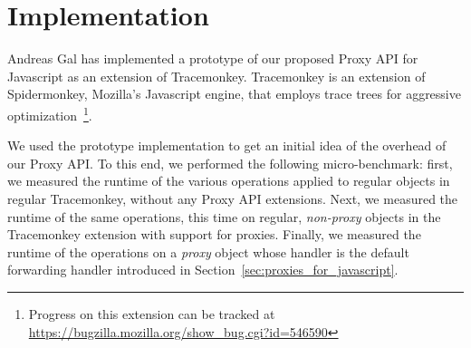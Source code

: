 \documentclass{sig-alternate}
\begin{document}




\section{Implementation}
\label{sub:benchmarks}

Andreas Gal has implemented a prototype of our proposed Proxy API for Javascript as an extension of Tracemonkey. Tracemonkey is an extension of Spidermonkey, Mozilla's Javascript engine, that employs trace trees for aggressive optimization~\cite{gal06efficient}\footnote{Progress on this extension can be tracked at \url{https://bugzilla.mozilla.org/show_bug.cgi?id=546590}}.

We used the prototype implementation to get an initial idea of the overhead of our Proxy API. To this end, we performed the following micro-benchmark: first, we measured the runtime of the various operations applied to regular objects in regular Tracemonkey, without any Proxy API extensions. Next, we measured the runtime of the same operations, this time on regular, \emph{non-proxy} objects in the Tracemonkey extension with support for proxies. Finally, we measured the runtime of the operations on a \emph{proxy} object whose handler is the default forwarding handler introduced in Section~\ref{sec:proxies_for_javascript}.
\end{document}
